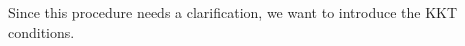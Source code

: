 \begin{algorithm}
                    \end{algorithm}

                Since this procedure needs a clarification, we want to introduce the KKT conditions.

